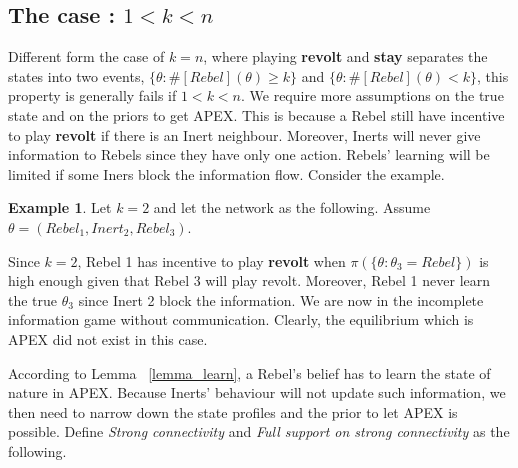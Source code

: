 \documentclass[12pt,letter]{article}
\theoremstyle{definition}
\newtheorem{example}{Example}[section]
\theoremstyle{remark}
\theoremstyle{claim}
\begin{document}
\subsection{The case : $1<k<n$}

Different form the case of $k=n$, where playing \textbf{revolt} and \textbf{stay} separates the states into two events, $\{\theta: \#[Rebel](\theta)\geq k\}$ and $\{\theta: \#[Rebel](\theta)< k\}$,  this property is generally fails if  $1<k<n$. We require more assumptions on the true state and on the priors to get APEX. This is because a Rebel still have incentive to play \textbf{revolt} if there is an Inert neighbour. Moreover, Inerts will never give information to Rebels since they have only one action. Rebels' learning will be limited if some Iners block the information flow. Consider the example. 

\begin{example}\label{ex_strong_connectivity}
Let $k=2$ and let the network as the following. Assume $\theta=(Rebel_1,Inert_2,Rebel_3)$.

\begin{center}
\end{center}

Since $k=2$, Rebel 1 has incentive to play \textbf{revolt} when $\pi(\{\theta:\theta_3=Rebel\})$ is high enough given that Rebel 3 will play revolt. Moreover, Rebel 1 never learn the true $\theta_3$ since Inert 2 block the information. We are now in the incomplete information game without communication. Clearly, the equilibrium which is APEX did not exist in this case.

\end{example}

According to Lemma ~\ref{lemma_learn}, a Rebel's belief has to learn the state of nature in APEX. Because Inerts' behaviour will not update such information, we then need to narrow down the state profiles and the prior to let APEX is possible. Define \textit{Strong connectivity} and \textit{Full support on strong connectivity} as the following.
\end{document}
